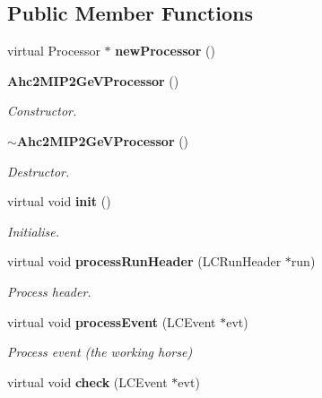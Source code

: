 \subsection*{Public Member Functions}
\begin{DoxyCompactItemize}
\item 
virtual Processor $\ast$ {\bfseries new\-Processor} ()\label{classCALICE_1_1Ahc2MIP2GeVProcessor_a7298172c4de82d57129cd2e5ae36f68b}

\item 
{\bf Ahc2\-M\-I\-P2\-Ge\-V\-Processor} ()\label{classCALICE_1_1Ahc2MIP2GeVProcessor_ab777ee23a63f9b782a8b62713c586835}

\begin{DoxyCompactList}\small\item\em Constructor. \end{DoxyCompactList}\item 
{\bf $\sim$\-Ahc2\-M\-I\-P2\-Ge\-V\-Processor} ()\label{classCALICE_1_1Ahc2MIP2GeVProcessor_ac4250234a03cfe94edd099dcada58d43}

\begin{DoxyCompactList}\small\item\em Destructor. \end{DoxyCompactList}\item 
virtual void {\bf init} ()\label{classCALICE_1_1Ahc2MIP2GeVProcessor_aeaaccd22b995e22688ec235d19230427}

\begin{DoxyCompactList}\small\item\em Initialise. \end{DoxyCompactList}\item 
virtual void {\bf process\-Run\-Header} (L\-C\-Run\-Header $\ast$run)\label{classCALICE_1_1Ahc2MIP2GeVProcessor_af3e43eb5e4f6ba85f86bea5d43985485}

\begin{DoxyCompactList}\small\item\em Process header. \end{DoxyCompactList}\item 
virtual void {\bf process\-Event} (L\-C\-Event $\ast$evt)\label{classCALICE_1_1Ahc2MIP2GeVProcessor_ac8478160bdb78253c8fe0f6a37049ef5}

\begin{DoxyCompactList}\small\item\em Process event (the working horse) \end{DoxyCompactList}\item 
virtual void {\bf check} (L\-C\-Event $\ast$evt)\label{classCALICE_1_1Ahc2MIP2GeVProcessor_ab7bc36ceb4918f6e9887056335c32587}


\end{DoxyCompactItemize}

